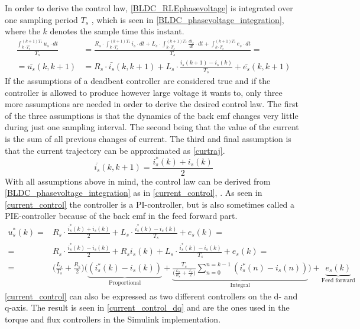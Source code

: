 \documentclass{LTHthesis}
\begin{document}
In order to derive the control law, \eqref{BLDC_RLEphasevoltage} is integrated over one sampling period $T_s$ \cite{ala_kar2014}, which is seen in \eqref{BLDC_phasevoltage_integration}, where the  $k$ denotes the sample time this instant.
\begin{align} \label{BLDC_phasevoltage_integration}
\frac{\int_{k\cdot T_s}^{(k+1)T_s}u_s\cdot dt}{T_s}&=\frac{R_s\cdot\int_{k\cdot T_s}^{(k+1)T_s}i_s\cdot dt+L_s\cdot\int_{k\cdot T_s}^{(k+1)T_s}\frac{di_s}{dt}\cdot dt+\int_{k\cdot T_s}^{(k+1)T_s}e_s\cdot dt}{T_s}=\nonumber\\=\bar{u_s}(k,k+1)&=R_s\cdot\bar{i_s}(k,k+1)+L_s\cdot\frac{i_s(k+1)-i_s(k)}{T_s}+\bar{e_s}(k,k+1)
\end{align}
If the assumptions of a deadbeat controller are considered true and if the controller is allowed to produce however large voltage it wants to, only three more assumptions are needed in order to derive the desired control law. The first of the three assumptions is that the dynamics of the back emf changes very little during just one sampling interval. The second being that the value of the current is the sum of all previous changes of current. The third and final assumption is that the current trajectory can be approximated as \eqref{curtraj}.
\begin{equation} \label{curtraj}
\bar{i_s}(k,k+1)=\frac{i_s^*(k)+i_s(k)}{2}
\end{equation}
With all assumptions above in mind, the control law can be derived from \eqref{BLDC_phasevoltage_integration} as in \eqref{current_control}, \cite{ala_kar2014}. As seen in \eqref{current_control} the controller is a PI-controller, but is also sometimes called a PIE-controller because of the back emf in the feed forward part.
\begin{align} \label{current_control}
u_s^*(k)=& R_s\cdot\frac{i_s^*(k)+i_s(k)}{2}+L_s\cdot\frac{i_s^*(k)-i_s(k)}{T_s}+e_s(k)=\nonumber\\=& R_s\cdot\frac{i_s^*(k)-i_s(k)}{2}+R_si_s(k)+L_s\cdot\frac{i_s^*(k)-i_s(k)}{T_s}+e_s(k)=\nonumber\\=& \bigg(\frac{L_s}{T_s}+\frac{R_s}{2}\bigg)\bigg(\underbrace{(i_s^*(k)-i_s(k))}_\text{Proportional}+\underbrace{\frac{T_s}{\big(\frac{L_s}{R_s}+\frac{T_s}{2}\big)}\sum\limits_{n=0}^{n=k-1}(i_s^*(n)-i_s(n))}_\text{Integral}\bigg)+\underbrace{e_s(k)}_\text{Feed forward}
\end{align}
\eqref{current_control} can also be expressed as two different controllers on the d- and q-axis. The result is seen in \eqref{current_control_dq} and are the ones used in the torque and flux controllers in the Simulink implementation.
\end{document}
